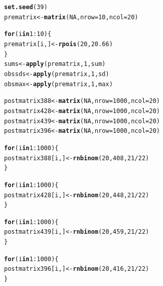 \documentclass[12pt]{article}\usepackage[]{graphicx}\usepackage[]{color}
\makeatletter
\newcommand{\hlnum}[1]{\textcolor[rgb]{0.686,0.059,0.569}{#1}}%
\newcommand{\hlopt}[1]{\textcolor[rgb]{0,0,0}{#1}}%
\newcommand{\hlstd}[1]{\textcolor[rgb]{0.345,0.345,0.345}{#1}}%
\newcommand{\hlkwa}[1]{\textcolor[rgb]{0.161,0.373,0.58}{\textbf{#1}}}%
\newcommand{\hlkwb}[1]{\textcolor[rgb]{0.69,0.353,0.396}{#1}}%
\newcommand{\hlkwc}[1]{\textcolor[rgb]{0.333,0.667,0.333}{#1}}%
\newcommand{\hlkwd}[1]{\textcolor[rgb]{0.737,0.353,0.396}{\textbf{#1}}}%
\newenvironment{kframe}{%
 \def\at@end@of@kframe{}%
 \ifinner\ifhmode%
  \def\at@end@of@kframe{\end{minipage}}%
  \begin{minipage}{\columnwidth}%
 \fi\fi%
 \def\FrameCommand##1{\hskip\@totalleftmargin \hskip-\fboxsep
 \colorbox{shadecolor}{##1}\hskip-\fboxsep
     \hskip-\linewidth \hskip-\@totalleftmargin \hskip\columnwidth}%
 \MakeFramed {\advance\hsize-\width
   \@totalleftmargin\z@ \linewidth\hsize
   \@setminipage}}%
 {\par\unskip\endMakeFramed%
 \at@end@of@kframe}
\newenvironment{knitrout}{}{} %
\makeatother
\begin{document}
\begin{knitrout}\footnotesize
{}\color{fgcolor}\begin{kframe}
\begin{alltt}
\hlkwd{set.seed}\hlstd{(}\hlnum{39}\hlstd{)}
\hlstd{prematrix} \hlkwb{<-} \hlkwd{matrix}\hlstd{(}\hlnum{NA}\hlstd{,} \hlkwc{nrow}\hlstd{=}\hlnum{10}\hlstd{,} \hlkwc{ncol}\hlstd{=}\hlnum{20}\hlstd{)}

\hlkwa{for}\hlstd{(i} \hlkwa{in} \hlnum{1}\hlopt{:}\hlnum{10}\hlstd{)\{}
  \hlstd{prematrix[i,]} \hlkwb{<-} \hlkwd{rpois}\hlstd{(}\hlnum{20}\hlstd{,} \hlnum{20.66}\hlstd{)}
\hlstd{\}}
\hlstd{sums} \hlkwb{<-} \hlkwd{apply}\hlstd{(prematrix,} \hlnum{1}\hlstd{, sum)}
\hlstd{obssds} \hlkwb{<-} \hlkwd{apply}\hlstd{(prematrix,} \hlnum{1}\hlstd{, sd)}
\hlstd{obsmax} \hlkwb{<-} \hlkwd{apply}\hlstd{(prematrix,} \hlnum{1}\hlstd{, max)}

\hlstd{postmatrix388} \hlkwb{<-} \hlkwd{matrix}\hlstd{(}\hlnum{NA}\hlstd{,} \hlkwc{nrow}\hlstd{=}\hlnum{1000}\hlstd{,} \hlkwc{ncol}\hlstd{=}\hlnum{20}\hlstd{)}
\hlstd{postmatrix428} \hlkwb{<-} \hlkwd{matrix}\hlstd{(}\hlnum{NA}\hlstd{,} \hlkwc{nrow}\hlstd{=}\hlnum{1000}\hlstd{,} \hlkwc{ncol}\hlstd{=}\hlnum{20}\hlstd{)}
\hlstd{postmatrix439} \hlkwb{<-} \hlkwd{matrix}\hlstd{(}\hlnum{NA}\hlstd{,} \hlkwc{nrow}\hlstd{=}\hlnum{1000}\hlstd{,} \hlkwc{ncol}\hlstd{=}\hlnum{20}\hlstd{)}
\hlstd{postmatrix396} \hlkwb{<-} \hlkwd{matrix}\hlstd{(}\hlnum{NA}\hlstd{,} \hlkwc{nrow}\hlstd{=}\hlnum{1000}\hlstd{,} \hlkwc{ncol}\hlstd{=}\hlnum{20}\hlstd{)}

\hlkwa{for}\hlstd{(i} \hlkwa{in} \hlnum{1}\hlopt{:}\hlnum{1000}\hlstd{)\{}
  \hlstd{postmatrix388[i,]} \hlkwb{<-} \hlkwd{rnbinom}\hlstd{(}\hlnum{20}\hlstd{,} \hlnum{408}\hlstd{,} \hlnum{21}\hlopt{/}\hlnum{22}\hlstd{)}
\hlstd{\}}

\hlkwa{for}\hlstd{(i} \hlkwa{in} \hlnum{1}\hlopt{:}\hlnum{1000}\hlstd{)\{}
  \hlstd{postmatrix428[i,]} \hlkwb{<-} \hlkwd{rnbinom}\hlstd{(}\hlnum{20}\hlstd{,} \hlnum{448}\hlstd{,} \hlnum{21}\hlopt{/}\hlnum{22}\hlstd{)}
\hlstd{\}}

\hlkwa{for}\hlstd{(i} \hlkwa{in} \hlnum{1}\hlopt{:}\hlnum{1000}\hlstd{)\{}
  \hlstd{postmatrix439[i,]} \hlkwb{<-} \hlkwd{rnbinom}\hlstd{(}\hlnum{20}\hlstd{,} \hlnum{459}\hlstd{,} \hlnum{21}\hlopt{/}\hlnum{22}\hlstd{)}
\hlstd{\}}

\hlkwa{for}\hlstd{(i} \hlkwa{in} \hlnum{1}\hlopt{:}\hlnum{1000}\hlstd{)\{}
  \hlstd{postmatrix396[i,]} \hlkwb{<-} \hlkwd{rnbinom}\hlstd{(}\hlnum{20}\hlstd{,} \hlnum{416}\hlstd{,} \hlnum{21}\hlopt{/}\hlnum{22}\hlstd{)}
\hlstd{\}}


\end{alltt}
\end{kframe}
\end{knitrout}
\end{document}
